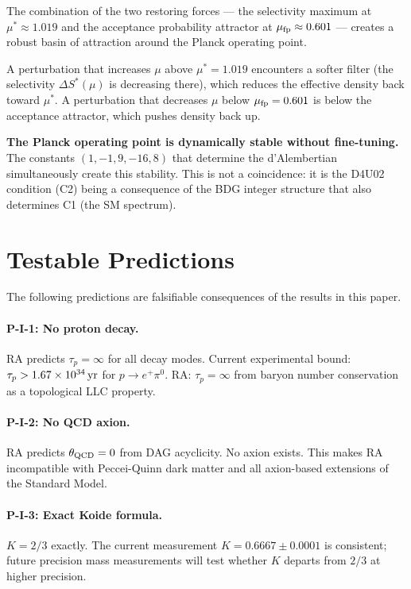 \documentclass[12pt,a4paper]{article}
\begin{document}
The combination of the two restoring forces --- the selectivity maximum at $\mu^*\approx1.019$ and the acceptance probability attractor at $\mu_{\rm fp}\approx0.601$ --- creates a robust basin of attraction around the Planck operating point.

A perturbation that increases $\mu$ above $\mu^*=1.019$ encounters a softer filter (the selectivity $\Delta S^*(\mu)$ is decreasing there), which reduces the effective density back toward $\mu^*$.  A perturbation that decreases $\mu$ below $\mu_{\rm fp}=0.601$ is below the acceptance attractor, which pushes density back up.

\textbf{The Planck operating point is dynamically stable without fine-tuning.}  The constants $(1,-1,9,-16,8)$ that determine the d'Alembertian simultaneously create this stability.  This is not a coincidence: it is the D4U02 condition (C2) being a consequence of the BDG integer structure that also determines C1 (the SM spectrum).

\section{Testable Predictions}\label{sec:predictions}

The following predictions are falsifiable consequences of the results in this paper.

\paragraph{P-I-1: No proton decay.}  RA predicts $\tau_p=\infty$ for all decay modes.  Current experimental bound: $\tau_p>1.67\times10^{34}\,\rm{yr}$ for $p\to e^+\pi^0$.  RA: $\tau_p=\infty$ from baryon number conservation as a topological LLC property.

\paragraph{P-I-2: No QCD axion.}  RA predicts $\theta_{\rm QCD}=0$ from DAG acyclicity.  No axion exists.  This makes RA incompatible with Peccei-Quinn dark matter and all axion-based extensions of the Standard Model.

\paragraph{P-I-3: Exact Koide formula.}  $K=2/3$ exactly.  The current measurement $K=0.6667\pm0.0001$ is consistent; future precision mass measurements will test whether $K$ departs from $2/3$ at higher precision.
\end{document}
